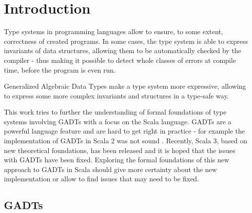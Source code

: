 \chapter{Introduction}

Type systems in programming languages allow to ensure, to some extent, correctness of created programs. In some cases, the type system is able to express invariants of data structures, allowing them to be automatically checked by the compiler - thus making it possible to detect whole classes of errors at compile time, before the program is even run.

Generalized Algebraic Data Types make a type system more expressive, allowing to express some more complex invariants and structures in a type-safe way.

This work tries to further the understanding of formal foundations of type systems involving GADTs with a focus on the Scala language. GADTs are a powerful language feature and are hard to get right in practice - for example the implementation of GADTs in Scala 2 was not sound \cite{squid, LionelPhD}. Recently, Scala 3, based on new theoretical foundations, has been released and it is hoped that the issues with GADTs have been fixed. Exploring the formal foundations of this new approach to GADTs in Scala should give more certainty about the new implementation or allow to find issues that may need to be fixed.


\section{GADTs}



